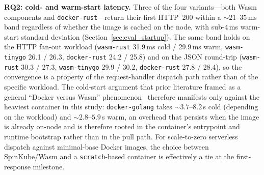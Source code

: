 \begin{sloppypar}
\textbf{RQ2: cold- and warm-start latency.} Three of the four variants---both \acs{Wasm} components and \texttt{docker-rust}---return their first \acs{HTTP}~200 within a ${\sim}21$--$35$\,ms band regardless of whether the image is cached on the node, with sub-4\,ms warm-start standard deviation (Section~\ref{sec:eval_startup}). The same band holds on the HTTP fan-out workload (\texttt{wasm-rust} 31.9\,ms cold / 29.9\,ms warm, \texttt{wasm-tinygo} 26.1 / 26.3, \texttt{docker-rust} 24.2 / 25.8) and on the \acs{JSON} round-trip (\texttt{wasm-rust} 30.3 / 27.3, \texttt{wasm-tinygo} 29.9 / 30.2, \texttt{docker-rust} 27.8 / 28.4), so the convergence is a property of the request-handler dispatch path rather than of the specific workload. The cold-start argument that prior literature framed as a general ``Docker versus \acs{Wasm}'' phenomenon~\cite{long2023wasm, wiegratz2024k8swasm} therefore manifests only against the heaviest container in this study: \texttt{docker-golang} takes ${\sim}3.7$--$8.2$\,s cold (depending on the workload) and ${\sim}2.8$--$5.9$\,s warm, an overhead that persists when the image is already on-node and is therefore rooted in the container's entrypoint and runtime bootstrap rather than in the pull path. For scale-to-zero serverless dispatch against minimal-base Docker images, the choice between SpinKube/\acs{Wasm} and a \texttt{scratch}-based container is effectively a tie at the first-response milestone.
\end{sloppypar}

